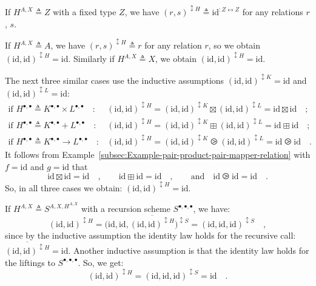 If $H^{A,X}\triangleq Z$ with a fixed type $Z$, we have $(r,s)^{\updownarrow H}\triangleq\text{id}^{:Z\leftrightarrow Z}$
for any relations $r$, $s$.

If $H^{A,X}\triangleq A$, we have $(r,s)^{\updownarrow H}\triangleq r$
for any relation $r$, so we obtain $(\text{id},\text{id})^{\updownarrow H}=\text{id}$.
Similarly if $H^{A,X}\triangleq X$, we obtain $(\text{id},\text{id})^{\updownarrow H}=\text{id}$.

The next three similar cases use the inductive assumptions $(\text{id},\text{id})^{\updownarrow K}=\text{id}$
and $(\text{id},\text{id})^{\updownarrow L}=\text{id}$:
\begin{align*}
\text{if }H^{\bullet,\bullet}\triangleq K^{\bullet,\bullet}\times L^{\bullet,\bullet}\quad: & (\text{id},\text{id})^{\updownarrow H}=(\text{id},\text{id})^{\updownarrow K}\boxtimes(\text{id},\text{id})^{\updownarrow L}=\text{id}\boxtimes\text{id}\quad;\\
\text{if }H^{\bullet,\bullet}\triangleq K^{\bullet,\bullet}+L^{\bullet,\bullet}\quad: & (\text{id},\text{id})^{\updownarrow H}=(\text{id},\text{id})^{\updownarrow K}\boxplus(\text{id},\text{id})^{\updownarrow L}=\text{id}\boxplus\text{id}\quad;\\
\text{if }H^{\bullet,\bullet}\triangleq K^{\bullet,\bullet}\rightarrow L^{\bullet,\bullet}\quad: & (\text{id},\text{id})^{\updownarrow H}=(\text{id},\text{id})^{\updownarrow K}\ogreaterthan(\text{id},\text{id})^{\updownarrow L}=\text{id}\ogreaterthan\text{id}\quad.
\end{align*}
It follows from Example~\ref{subsec:Example-pair-product-pair-mapper-relation}
with $f=\text{id}$ and $g=\text{id}$ that 
\[
\text{id}\boxtimes\text{id}=\text{id}\quad,\quad\quad\text{id}\boxplus\text{id}=\text{id}\quad,\quad\quad\text{and}\quad\text{id}\ogreaterthan\text{id}=\text{id}\quad.
\]
So, in all three cases we obtain: $(\text{id},\text{id})^{\updownarrow H}=\text{id}$.

If $H^{A,X}\triangleq S^{A,X,H^{A,X}}$ with a recursion scheme $S^{\bullet,\bullet,\bullet}$,
we have:
\[
(\text{id},\text{id})^{\updownarrow H}=\big(\text{id},\text{id},\overline{(\text{id},\text{id})^{\updownarrow H}}\big)^{\updownarrow S}=(\text{id},\text{id},\text{id})^{\updownarrow S}\quad,
\]
since by the inductive assumption the identity law holds for the recursive
call: $\overline{(\text{id},\text{id})^{\updownarrow H}}=\text{id}$.
Another inductive assumption is that the identity law holds for the
liftings to $S^{\bullet,\bullet,\bullet}$. So, we get: 
\[
(\text{id},\text{id})^{\updownarrow H}=(\text{id},\text{id},\text{id})^{\updownarrow S}=\text{id}\quad.
\]

